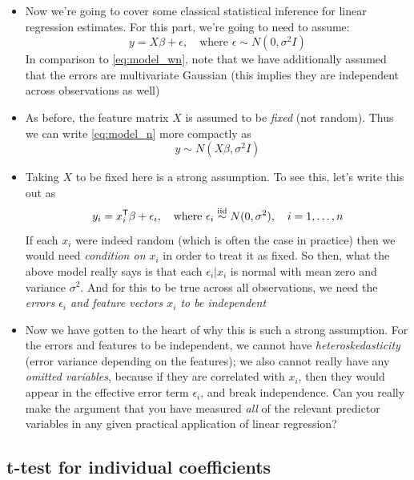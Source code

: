 \documentclass{article}
\begin{document}
\begin{itemize}
\item Now we're going to cover some classical statistical inference for linear
  regression estimates. For this part, we're going to need to assume:
  \begin{equation}
  \label{eq:model_n}
  y = X \beta + \epsilon, \quad \text{where $\epsilon \sim N(0, \sigma^2 I)$}
  \end{equation}
  In comparison to \eqref{eq:model_wn}, note that we have additionally assumed
  that the errors are multivariate Gaussian (this implies they are independent
  across observations as well)

\item As before, the feature matrix $X$ is assumed to  be \emph{fixed} (not
  random). Thus we can write \eqref{eq:model_n} more compactly as  
  \[
  y \sim N(X \beta, \sigma^2 I)
  \]

\item Taking $X$ to be fixed here is a strong assumption. To see this, let's
  write this out as 
  \[
  y_i = x_i^{\mathsf{T}} \beta + \epsilon_i, \quad \text{where $\epsilon_i \overset{\text{iid}}{\sim} N(0,  
  \sigma^2)$}, \quad i=1,\dots,n
  \]
  If each $x_i$ were indeed random (which is often the case in practice) then we
  would need \emph{condition on $x_i$} in order to treat it as fixed. So then,
  what the above model really says is that each $\epsilon_i | x_i$ is normal
  with mean zero and variance $\sigma^2$. And for this to be true across all 
  observations, we need the \emph{errors $\epsilon_i$ and feature vectors $x_i$
    to be independent}

\item Now we have gotten to the heart of why this is such a strong
  assumption. For the errors and features to be independent, we cannot have
  \emph{heteroskedasticity} (error variance depending on the features); we also
  cannot really have any \emph{omitted variables}, because if they are
  correlated with $x_i$, then they would appear in the effective error term
  $\epsilon_i$, and break independence. Can you really make the argument that
  you have measured \emph{all} of the relevant predictor variables in any given 
  practical application of linear regression? 
\end{itemize}

\subsection{t-test for individual coefficients}
\end{document}

